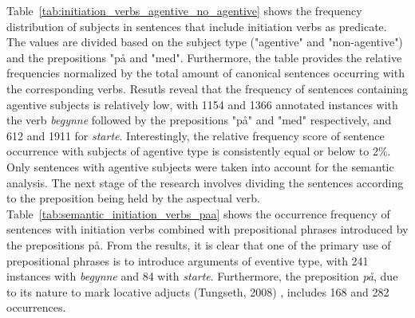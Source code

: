 \documentclass{article}
\begin{document}
Table~\ref{tab:initiation_verbs_agentive_no_agentive} shows the frequency distribution of subjects in sentences that include initiation verbs as predicate. The values are divided based on the subject type ("agentive" and "non-agentive") and the prepositions "på and "med". Furthermore, the table provides the relative frequencies normalized by the total amount of canonical sentences occurring with the corresponding verbs.
Resutls reveal that the frequency of sentences containing agentive subjects is relatively low, with 1154 and 1366 annotated instances with the verb \emph{begynne} followed by the prepositions "på" and "med" respectively, and 612 and 1911 for \emph{starte}. Interestingly, the relative frequency score of sentence occurrence with subjects of agentive type is consistently equal or below to 2\%. Only sentences with agentive subjects were taken into account for the semantic analysis.
The next stage of the research involves dividing the sentences according to the preposition being held by the aspectual verb. 
Table~\ref{tab:semantic_initiation_verbs_paa} shows the occurrence frequency of sentences with initiation verbs combined with prepositional phrases introduced by the prepositions på. From the results, it is clear that one of the primary use of prepositional phrases is to introduce arguments of eventive type, with 241 instances with \emph{begynne} and 84 with \emph{starte}. Furthermore, the preposition \emph{på}, due to its nature to mark locative adjucts (Tungseth, 2008)
, includes 168 and 282 occurrences. 
\end{document}

